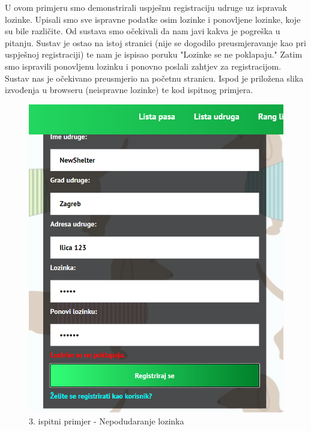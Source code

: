 		 U ovom primjeru smo demonstrirali uspješnu registraciju udruge uz ispravak lozinke. Upisali smo sve ispravne podatke osim lozinke i ponovljene lozinke, koje su bile različite. Od sustava smo očekivali da nam javi kakva je pogreška u pitanju. Sustav je ostao na istoj stranici (nije se dogodilo preusmjeravanje kao pri uspješnoj registraciji) te nam je ispisao poruku "Lozinke se ne poklapaju." Zatim smo ispravili ponovljenu lozinku i ponovno poslali zahtjev za registracijom. Sustav nas je očekivano preusmjerio na početnu stranicu. Ispod je priložena slika izvođenja u browseru (neispravne lozinke) te kod ispitnog primjera. 
			 
			  \begin{figure}[H]
			  	\centerline{
			 	\includegraphics[scale=0.65]{slike/PasswordError.PNG}}
			 	\caption{3. ispitni primjer - Nepodudaranje lozinka}
			 	\centering
			 \end{figure}

